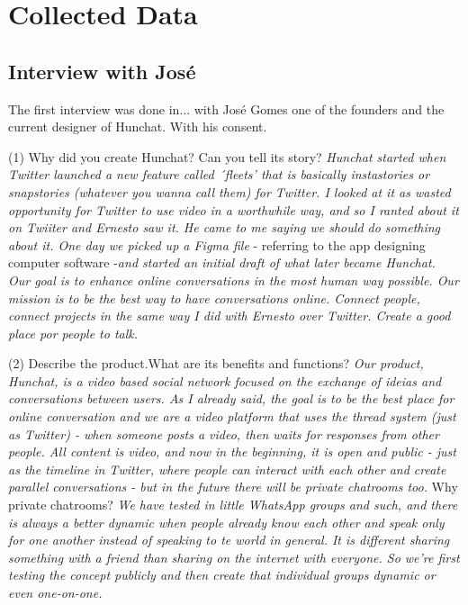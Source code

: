 \documentclass[11pt]{article}
\begin{document}
\cleardoublepage
\newpage	

\printbibliography
\cleardoublepage

\appendix

\section{Collected Data}\label{data}
\subsection {Interview with José} \label{ze}
The first interview was done in... with José Gomes one of the founders and the current designer of Hunchat. With his consent.

(1) Why did you create Hunchat? Can you tell its story? \textit{Hunchat started when Twitter launched a new feature called ´fleets' that is basically instastories or snapstories (whatever you wanna call them) for Twitter. I looked at it as wasted opportunity for Twitter to use video in a worthwhile way, and so I ranted about it on Twiiter and Ernesto saw it. He came to me saying we should do something about it. One day we picked up a Figma file} - referring to the app designing computer software -\textit{and started an initial draft of what later became Hunchat. Our goal is to enhance online conversations in the most human way possible. Our mission is to be the best way to have conversations online. Connect people, connect projects in the same way I did with Ernesto over Twitter. Create a good place por people to talk.} 

(2) Describe the product.What are its benefits and functions? \textit{Our product, Hunchat, is a video based social network focused on the exchange of ideias and conversations between users. As I already said, the goal is to be the best place for online conversation and we are a video platform that uses the thread system (just as Twitter) - when someone posts a video, then waits for responses from other people. All content is video, and now in the beginning, it is open and public - just as the timeline in Twitter, where people can interact with each other and create parallel conversations - but in the future there will be private chatrooms too.} Why private chatrooms? \textit{We have tested in little WhatsApp groups and such, and there is always a better dynamic when people already know each other and speak only for one another instead of speaking to te world in general. It is different sharing something with a friend than sharing on the internet with everyone. So we're first testing the concept publicly and then create that individual groups dynamic or even one-on-one.}
\end{document}
